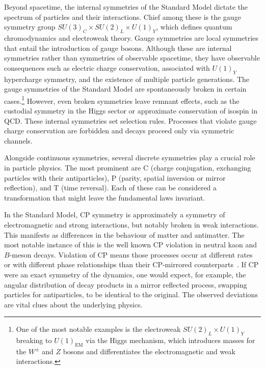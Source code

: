         Beyond spacetime, the internal symmetries of the Standard Model dictate the spectrum of particles and their interactions.
        Chief among these is the gauge symmetry group $SU(3)_C \times SU(2)_L \times U(1)_Y$, which defines quantum chromodynamics and electroweak theory.
        Gauge symmetries are local symmetries that entail the introduction of gauge bosons.
        Although these are internal symmetries rather than symmetries of observable spacetime, they have observable consequences such as electric charge conservation, associated with $U(1)_Y$ hypercharge symmetry, and the existence of multiple particle generations.
        The gauge symmetries of the Standard Model are spontaneously broken in certain cases.\footnote{One of the most notable examples is the electroweak $SU(2)_L \times U(1)_Y$ breaking to $U(1)_{\text{EM}}$ via the Higgs mechanism, which introduces masses for the $W^\pm$ and $Z$ bosons and differentiates the electromagnetic and weak interactions.}
        However, even broken symmetries leave remnant effects, such as the custodial symmetry in the Higgs sector or approximate conservation of isospin in QCD.
        These internal symmetries set selection rules.
        Processes that violate gauge charge conservation are forbidden and decays proceed only via symmetric channels.

        Alongside continuous symmetries, several discrete symmetries play a crucial role in particle physics.
        The most prominent are C (charge conjugation, exchanging particles with their antiparticles), P (parity, spatial inversion or mirror reflection), and T (time reversal).
        Each of these can be considered a transformation that might leave the fundamental laws invariant.
        
        In the Standard Model, CP symmetry is approximately a symmetry of electromagnetic and strong interactions, but notably broken in weak interactions.
        This manifests as differences in the behaviour of matter and antimatter.
        The most notable instance of this is the well known CP violation in neutral kaon and $B$-meson decays.
        Violation of CP means those processes occur at different rates or with different phase relationships than their CP-mirrored counterparts~\cite{Neubert:1996qg}.
        If CP were an exact symmetry of the dynamics, one would expect, for example, the angular distribution of decay products in a mirror reflected process, swapping particles for antiparticles, to be identical to the original.
        The observed deviations are vital clues about the underlying physics.
        

